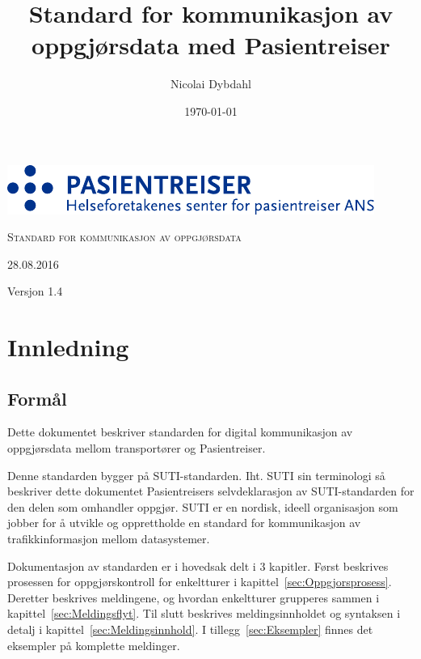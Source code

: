 \documentclass[a4paper,titlepage,norsk,11pt]{article}
\begin{document}

\title{Standard for kommunikasjon av oppgjørsdata med Pasientreiser}

\author{Nicolai Dybdahl}
\renewcommand{\dateseparator}{.}
\date{\ddmmyyyydate \today}

\begin{titlepage}
\vspace*{3cm}
{\centering

  \includegraphics[scale=1.2]{pasientreiser.pdf} \\
  \vspace{5.5cm}
  {\scshape\huge Standard for kommunikasjon av oppgjørsdata\par}
  \vspace{2cm}
  {\large 28.08.2016\par}
  \vspace{1.5cm}
  {\large Versjon 1.4\par}

}

\end{titlepage}

\newpage

\setcounter{tocdepth}{2}

\newpage
\tableofcontents

\newpage
{}

\section{Innledning}

\subsection{Formål}
Dette dokumentet beskriver standarden for digital kommunikasjon av oppgjørsdata mellom transportører og Pasientreiser.

Denne standarden bygger på SUTI-standarden. Iht. SUTI sin terminologi så beskriver dette dokumentet Pasientreisers selvdeklarasjon av SUTI-standarden for den delen som omhandler oppgjør. SUTI  er en nordisk, ideell organisasjon som jobber for å utvikle og opprettholde en standard for kommunikasjon av trafikkinformasjon mellom datasystemer.

Dokumentasjon av standarden er i hovedsak delt i 3 kapitler. Først beskrives prosessen for oppgjørskontroll for enkeltturer i kapittel~\ref{sec:Oppgjorsprosess}. Deretter beskrives meldingene, og hvordan enkeltturer grupperes sammen i kapittel~\ref{sec:Meldingsflyt}. Til slutt beskrives meldingsinnholdet og syntaksen i detalj i kapittel~\ref{sec:Meldingsinnhold}. I tillegg~\ref{sec:Eksempler} finnes det eksempler på komplette meldinger.
\end{document}
